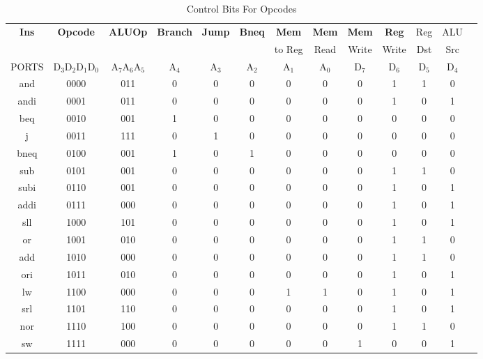 \documentclass[12]{article}
\begin{document}
\begin{table}[!h]
    \centering
    \small
    \begin{tabular}{|c|c|c|c|c|c|c|c|c|c|c|c|c|}
        \hline
        \multirow{2}{*}{\textbf{Ins}} & \multirow{2}{*}{\textbf{Opcode}} & \multirow{2}{*}{\textbf{ALUOp}} & \multirow{2}{*}{\textbf{Branch}} & \multirow{2}{*}{\textbf{Jump}} & \multirow{2}{*}{\textbf{Bneq}} & \textbf{Mem} & \textbf{Mem} & \textbf{Mem} & \textbf{Reg} & Reg & ALU \\
        & & & & & & to Reg & Read & Write & Write & Dst & Src \\ \hline \hline
        PORTS & D$_3$D$_2$D$_1$D$_0$ & A$_7$A$_6$A$_5$ & A$_4$ & A$_3$ & A$_2$ & A$_1$ & A$_0$ & D$_7$ & D$_6$ & D$_5$ & D$_4$ \\ \hline
        and & 0000 & 011 & 0 & 0 & 0 & 0 & 0 & 0 & 1 & 1 & 0  \\ \hline
        andi & 0001 & 011 & 0 & 0 & 0 & 0 & 0 & 0 & 1 & 0 & 1 \\ \hline
        beq & 0010 & 001 & 1 & 0 & 0 & 0 & 0 & 0 & 0 & 0 & 0 \\ \hline
        j & 0011 & 111 & 0 & 1 & 0 & 0 & 0 & 0 & 0 & 0 & 0 \\ \hline
        bneq & 0100 & 001 & 1 & 0 & 1 & 0 & 0 & 0 & 0 & 0 & 0 \\ \hline
        sub & 0101 & 001 & 0 & 0 & 0 & 0 & 0 & 0 & 1 & 1 & 0 \\ \hline
        subi & 0110 & 001 & 0 & 0 & 0 & 0 & 0 & 0 & 1 & 0 & 1 \\ \hline
        addi & 0111 & 000 & 0 & 0 & 0 & 0 & 0 & 0 & 1 & 0 & 1 \\ \hline
        sll & 1000 & 101 & 0 & 0 & 0 & 0 & 0 & 0 & 1 & 0 & 1 \\ \hline
        or & 1001 & 010 & 0 & 0 & 0 & 0 & 0 & 0 & 1 & 1 & 0  \\ \hline
        add & 1010 & 000 & 0 & 0 & 0 & 0 & 0 & 0 & 1 & 1  & 0 \\ \hline
        ori & 1011 & 010 & 0 & 0 & 0 & 0 & 0 & 0 & 1 & 0 & 1 \\ \hline
        lw & 1100 & 000 & 0 & 0 & 0 & 1 & 1 & 0 & 1 & 0 & 1 \\ \hline
        srl & 1101 & 110 & 0 & 0 & 0 & 0 & 0 & 0 & 1 & 0 & 1 \\ \hline
        nor & 1110 & 100  & 0 & 0 & 0 & 0 & 0 & 0 & 1 & 1 & 0 \\ \hline
        sw & 1111 & 000 & 0 & 0 & 0 & 0 & 0 & 1 & 0 & 0 & 1 \\ \hline
        \hline
    \end{tabular}
    \label{tab:1}
    \caption{Control Bits For Opcodes}
\end{table}
\end{document}

